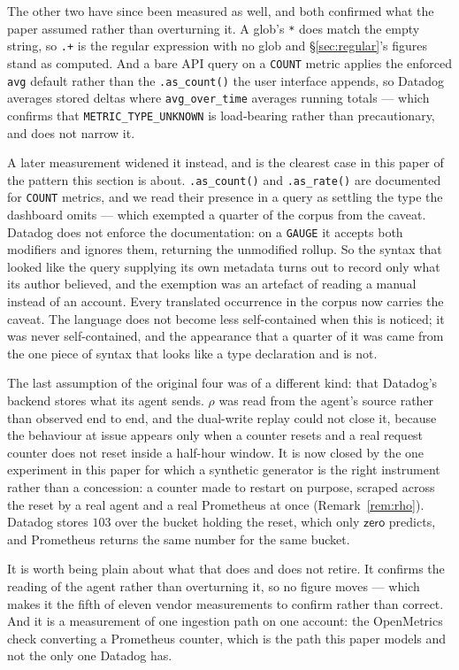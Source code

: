 The other two have since been measured as well, and both confirmed what the paper
assumed rather than overturning it. A glob's \texttt{*} does match the empty string, so
\texttt{.+} is the regular expression with no glob and \S\ref{sec:regular}'s figures stand
as computed. And a bare API query on a \texttt{COUNT} metric applies the enforced
\texttt{avg} default rather than the \texttt{.as\_count()} the user interface appends, so
Datadog averages stored deltas where \texttt{avg\_over\_time} averages running totals ---
which confirms that \texttt{METRIC\_TYPE\_UNKNOWN} is load-bearing rather than
precautionary, and does not narrow it.

A later measurement widened it instead, and is the clearest case in this paper of the
pattern this section is about. \texttt{.as\_count()} and \texttt{.as\_rate()} are
documented for \texttt{COUNT} metrics, and we read their presence in a query as settling
the type the dashboard omits --- which exempted a quarter of the corpus from the caveat.
Datadog does not enforce the documentation: on a \texttt{GAUGE} it accepts both modifiers
and ignores them, returning the unmodified rollup. So the syntax that looked like the
query supplying its own metadata turns out to record only what its author believed, and
the exemption was an artefact of reading a manual instead of an account. Every translated
occurrence in the corpus now carries the caveat. The language does not become less
self-contained when this is noticed; it was never self-contained, and the appearance that
a quarter of it was came from the one piece of syntax that looks like a type declaration
and is not.

The last assumption of the original four was of a different kind: that Datadog's backend
stores what its agent sends. $\rho$ was read from the agent's source rather than observed
end to end, and the dual-write replay could not close it, because the behaviour at issue
appears only when a counter resets and a real request counter does not reset inside a
half-hour window. It is now closed by the one experiment in this paper for which a
synthetic generator is the right instrument rather than a concession: a counter made to
restart on purpose, scraped across the reset by a real agent and a real Prometheus at
once (Remark~\ref{rem:rho}). Datadog stores $103$ over the bucket holding the reset,
which only $\mathsf{zero}$ predicts, and Prometheus returns the same number for the same
bucket.

It is worth being plain about what that does and does not retire. It confirms the reading
of the agent rather than overturning it, so no figure moves --- which makes it the fifth
of eleven vendor measurements to confirm rather than correct. And it is a measurement of one
ingestion path on one account: the OpenMetrics check converting a Prometheus counter,
which is the path this paper models and not the only one Datadog has.

